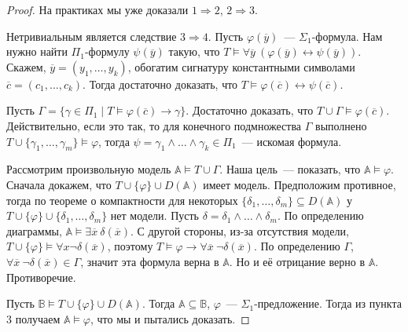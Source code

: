 \begin{proof}
    На практиках мы уже доказали $1 \Rightarrow 2$, $2 \Rightarrow 3$.

    Нетривиальным является следствие $3 \Rightarrow 4$. Пусть $\varphi(\overline{y})$~— $\Sigma_1$-формула. Нам нужно найти $\Pi_1$-формулу $\psi(\overline{y})$ такую, что $T \models \forall \overline{y}~(\varphi(\overline{y}) \leftrightarrow \psi(\overline{y}))$. Скажем, $\overline{y} = (y_1, \ldots, y_k)$, обогатим сигнатуру константными символами $\overline{c} = (c_1, \ldots, c_k)$. Тогда достаточно доказать, что $T \models \varphi(\overline{c}) \leftrightarrow \psi(\overline{c})$. 

    Пусть $\Gamma = \{\gamma\in \Pi_1 \mid T \models \varphi(\overline{c}) \rightarrow \gamma\}.$
    Достаточно доказать, что $T \cup \Gamma \models \varphi(\overline{c})$. Действительно, если это так, то для конечного подмножества $\Gamma$ выполнено $T \cup \{\gamma_1, \ldots, \gamma_m\} \models \varphi$, тогда $\psi = \gamma_1 \wedge \ldots \wedge \gamma_k \in \Pi_1$~— искомая формула.

    Рассмотрим произвольную модель $\mathbb{A}\models T\cup\Gamma$. Наша цель~— показать, что $\mathbb{A}\models\varphi$. Сначала докажем, что $T\cup\{\varphi\}\cup D(\mathbb{A})$ имеет модель. Предположим противное, тогда по теореме о компактности для некоторых $\{\delta_1, \ldots, \delta_m\}\subseteq D(\mathbb{A})$ у $T\cup \{\varphi\} \cup \{\delta_1, \ldots, \delta_m\}$ нет модели. Пусть $\delta = \delta_1\wedge\ldots\wedge\delta_m$. По определению диаграммы, $\mathbb{A}\models \exists \overline{x}~\delta(\overline{x})$. С другой стороны, из-за отсутствия модели, $T\cup\{\varphi\}\models \forall x \neg \delta(\overline{x})$, поэтому $T\models \varphi\rightarrow \forall \overline{x}~\neg \delta(\overline{x})$. По определению $\Gamma$, $\forall \overline{x}~\neg\delta(\overline{x})\in \Gamma$, значит эта формула верна в $\mathbb{A}$. Но и её отрицание верно в $\mathbb{A}$. Противоречие.

    Пусть $\mathbb{B}\models T\cup\{\varphi\}\cup D(\mathbb{A})$. Тогда $\mathbb{A}\subseteq\mathbb{B}$, $\varphi$~— $\Sigma_1$-предложение. Тогда из пункта 3 получаем $\mathbb{A}\models \varphi$, что мы и пытались доказать.


\end{proof}
